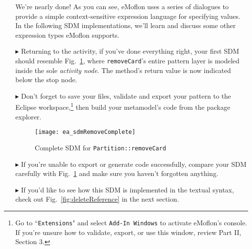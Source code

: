 \begin{itemize}
\vspace{0.5cm}

We're nearly done! As you can see, eMoflon uses a series of dialogues to provide a simple context-sensitive expression language for specifying  values. In the
following SDM implementations, we'll learn and discuss some other expression types eMoflon supports.

\vspace{0.5cm}

\item[$\blacktriangleright$] Returning to the activity, if you've done everything right, your first SDM should resemble
Fig.~\ref{fig:sdm_complete_control_flow}, where \texttt{removeCard}'s entire pattern layer is modeled inside the sole \emph{activity node}. The method's return
value is now indicated below the stop node.

\vspace{0.5cm}

\item[$\blacktriangleright$]  Don't forget to save your files, validate and export your pattern to the Eclipse workspace,\footnote{Go to
``\texttt{Extensions}" and select \texttt{Add-In Windows} to activate eMoflon's console. If you're unsure how to validate, export, or use this window, review
Part II, Section 3.} then build your metamodel's code from the package explorer.

\newpage

\begin{figure}[htbp]
\begin{center}
  \texttt{[image: ea\_sdmRemoveComplete]}
  \caption{Complete SDM for \texttt{Partition::removeCard}}  
  \label{fig:sdm_complete_control_flow}
\end{center}
\end{figure}

\item[$\blacktriangleright$] If you're unable to export or generate code successfully, compare your SDM carefully with Fig.~\ref{fig:sdm_complete_control_flow}
and make sure you haven't forgotten anything.

\vspace{0.5cm}

\item[$\blacktriangleright$] If you'd like to see how this SDM is implemented in the textual syntax, check out Fig.~\ref{fig:deleteReference} in the
next section.


\end{itemize}

